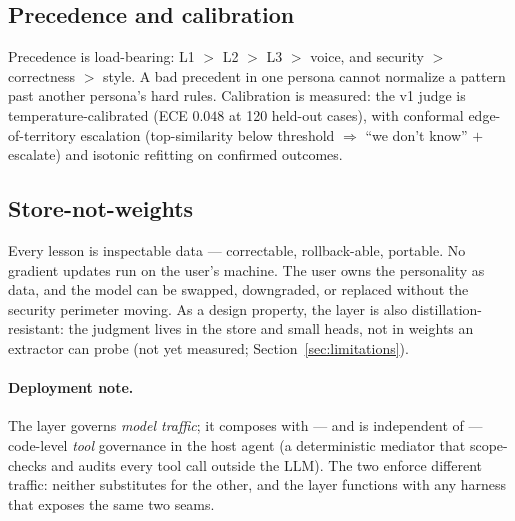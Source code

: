 \documentclass[11pt]{article}
\begin{document}
\subsection{Precedence and calibration}
Precedence is load-bearing: L1 $>$ L2 $>$ L3 $>$ voice, and security $>$ correctness $>$ style. A bad precedent in one persona cannot normalize a pattern past another persona's hard rules. Calibration is measured: the v1 judge is temperature-calibrated (ECE $0.048$ at 120 held-out cases), with conformal edge-of-territory escalation (top-similarity below threshold $\Rightarrow$ ``we don't know'' $+$ escalate) and isotonic refitting on confirmed outcomes.

\subsection{Store-not-weights}
Every lesson is inspectable data --- correctable, rollback-able, portable. No gradient updates run on the user's machine. The user owns the personality as data, and the model can be swapped, downgraded, or replaced without the security perimeter moving. As a design property, the layer is also distillation-resistant: the judgment lives in the store and small heads, not in weights an extractor can probe (not yet measured; Section~\ref{sec:limitations}).

\paragraph{Deployment note.} The layer governs \emph{model traffic}; it composes with --- and is independent of --- code-level \emph{tool} governance in the host agent (a deterministic mediator that scope-checks and audits every tool call outside the LLM). The two enforce different traffic: neither substitutes for the other, and the layer functions with any harness that exposes the same two seams.
\end{document}
